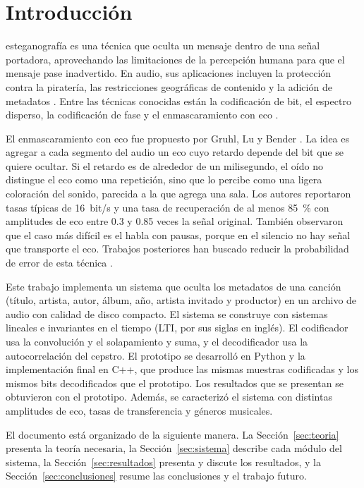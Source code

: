\documentclass[journal]{IEEEtran}
\begin{document}
\section{Introducción}
 esteganografía es una técnica que oculta un mensaje dentro
de una señal portadora, aprovechando las limitaciones de la percepción humana
para que el mensaje pase inadvertido. En audio, sus aplicaciones incluyen la
protección contra la piratería, las restricciones geográficas de contenido y la
adición de metadatos \cite{dutta2009review,kaur2014survey}. Entre las técnicas
conocidas están la codificación de bit, el espectro disperso, la codificación de
fase y el enmascaramiento con eco \cite{dutta2009review,kaur2014survey}.

El enmascaramiento con eco fue propuesto por Gruhl, Lu y Bender
\cite{gruhl1996echo}. La idea es agregar a cada segmento del audio un eco cuyo
retardo depende del bit que se quiere ocultar. Si el retardo es de alrededor de
un milisegundo, el oído no distingue el eco como una repetición, sino que lo
percibe como una ligera coloración del sonido, parecida a la que agrega una
sala. Los autores reportaron tasas típicas de 16~bit/s y una tasa de
recuperación de al menos 85~\% con amplitudes de eco entre 0.3 y 0.85 veces la
señal original. También observaron que el caso más difícil es el habla con
pausas, porque en el silencio no hay señal que transporte el eco. Trabajos
posteriores han buscado reducir la probabilidad de error de esta técnica
\cite{korzhik2013zero}.

Este trabajo implementa un sistema que oculta los metadatos de una canción
(título, artista, autor, álbum, año, artista invitado y productor) en un
archivo de audio con calidad de disco compacto. El sistema se construye con
sistemas lineales e invariantes en el tiempo (LTI, por sus siglas en inglés).
El codificador usa la convolución y el solapamiento y suma, y el decodificador
usa la autocorrelación del cepstro. El prototipo se desarrolló en Python y la
implementación final en C++, que produce las mismas muestras codificadas y los
mismos bits decodificados que el prototipo. Los resultados que se presentan se
obtuvieron con el prototipo. Además, se caracterizó el sistema con distintas amplitudes de eco,
tasas de transferencia y géneros musicales.

El documento está organizado de la siguiente manera. La
Sección~\ref{sec:teoria} presenta la teoría necesaria, la
Sección~\ref{sec:sistema} describe cada módulo del sistema, la
Sección~\ref{sec:resultados} presenta y discute los resultados, y la
Sección~\ref{sec:conclusiones} resume las conclusiones y el trabajo futuro.
\end{document}
